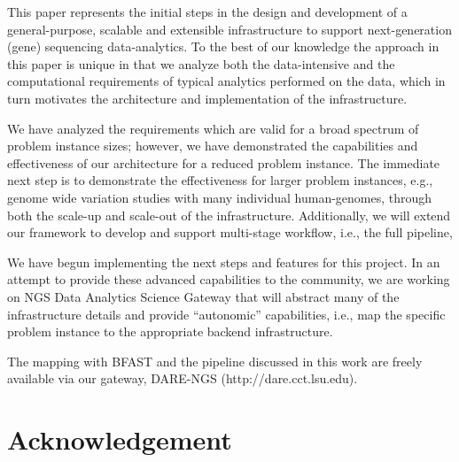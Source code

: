 \documentclass{cpeauth}
\begin{document}
This paper represents the initial steps in the design and development
of a general-purpose, scalable and extensible infrastructure to
support next-generation (gene) sequencing data-analytics. To the best
of our knowledge the approach in this paper is unique in that we
analyze both the data-intensive and the computational requirements of
typical analytics performed on the data, which in turn motivates the
architecture and implementation of the infrastructure. 

We have analyzed the requirements which are valid for a broad spectrum
of problem instance sizes; however, we have demonstrated the
capabilities and effectiveness of our architecture for a reduced
problem instance. The immediate next step is to demonstrate the
effectiveness for larger problem instances, e.g., genome wide
variation studies with many individual human-genomes, through both the
scale-up and scale-out of the infrastructure.  Additionally, we will
extend our framework to develop and support multi-stage workflow,
i.e., the full pipeline,
 
We have begun implementing the next steps and features for this
project. In an attempt to provide these advanced capabilities to the
community, we are working on NGS Data Analytics Science Gateway that
will abstract many of the infrastructure details and provide
``autonomic'' capabilities, i.e., map the specific problem instance to
the appropriate backend infrastructure.

The mapping with BFAST and the pipeline discussed in this work are freely available via our gateway, DARE-NGS (http://dare.cct.lsu.edu).


\section*{Acknowledgement}
\end{document}
